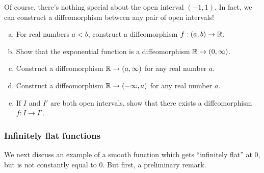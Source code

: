 Of course, there's nothing special about the open interval $(-1,1)$. In fact, we can construct a diffeomorphism between any pair of open intervals!

\begin{exercise} \label{open-intervals-diffeomorphic}
	\begin{enumerate}[(a)]
		\item For real numbers $a < b$, construct a diffeomorphism $f : (a, b) \to \mathbb{R}$.
		\item Show that the exponential function is a diffeomorphism $\mathbb{R} \to (0, \infty)$. 
		\item Construct a diffeomorphism $\mathbb{R} \to (a, \infty)$ for any real number $a$. 
		\item Construct a diffeomorphism $\mathbb{R} \to (-\infty, a)$ for any real number $a$. 
		\item If $I$ and $I'$ are both open intervals, show that there exists a diffeomorphism $f : I \to I'$. 
	\end{enumerate}
\end{exercise}

\subsubsection*{Infinitely flat functions}

We next discuss an example of a smooth function which gets ``infinitely flat'' at 0, but is not constantly equal to 0. But first, a preliminary remark. 

